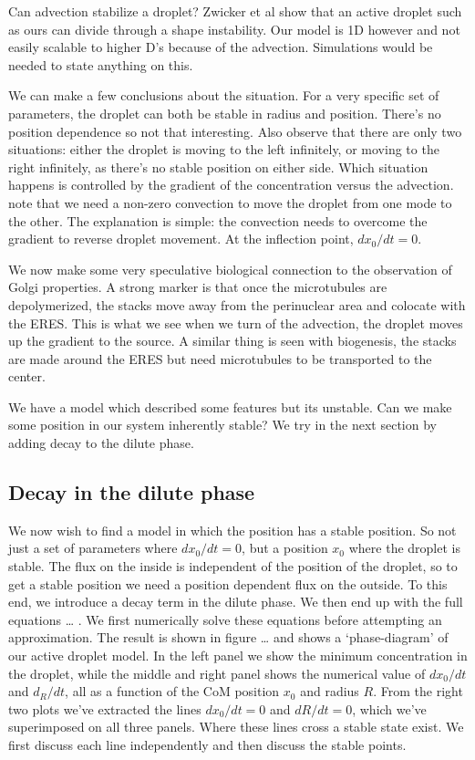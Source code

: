 \documentclass[12pt,a4paper,]{Dissertate}
\begin{document}
Can advection stabilize a droplet? Zwicker et al show that an active
droplet such as ours can divide through a shape instability. Our model
is 1D however and not easily scalable to higher D's because of the
advection. Simulations would be needed to state anything on this.

We can make a few conclusions about the situation. For a very specific
set of parameters, the droplet can both be stable in radius and
position. There's no position dependence so not that interesting. Also
observe that there are only two situations: either the droplet is moving
to the left infinitely, or moving to the right infinitely, as there's no
stable position on either side. Which situation happens is controlled by
the gradient of the concentration versus the advection. note that we
need a non-zero convection to move the droplet from one mode to the
other. The explanation is simple: the convection needs to overcome the
gradient to reverse droplet movement. At the inflection point,
\(dx_0/dt=0\).

We now make some very speculative biological connection to the
observation of Golgi properties. A strong marker is that once the
microtubules are depolymerized, the stacks move away from the
perinuclear area and colocate with the ERES. This is what we see when we
turn of the advection, the droplet moves up the gradient to the source.
A similar thing is seen with biogenesis, the stacks are made around the
ERES but need microtubules to be transported to the center.

We have a model which described some features but its unstable. Can we
make some position in our system inherently stable? We try in the next
section by adding decay to the dilute phase.

\hypertarget{decay-in-the-dilute-phase}{%
\subsection{Decay in the dilute phase}\label{decay-in-the-dilute-phase}}

We now wish to find a model in which the position has a stable position.
So not just a set of parameters where \(dx_0/dt=0\), but a position
\(x_0\) where the droplet is stable. The flux on the inside is
independent of the position of the droplet, so to get a stable position
we need a position dependent flux on the outside. To this end, we
introduce a decay term in the dilute phase. We then end up with the full
equations \ldots{} . We first numerically solve these equations before
attempting an approximation. The result is shown in figure \ldots{} and
shows a `phase-diagram' of our active droplet model. In the left panel
we show the minimum concentration in the droplet, while the middle and
right panel shows the numerical value of \(dx_0/dt\) and \(d_R/dt\), all
as a function of the CoM position \(x_0\) and radius \(R\). From the
right two plots we've extracted the lines \(dx_0/dt=0\) and \(dR/dt=0\),
which we've superimposed on all three panels. Where these lines cross a
stable state exist. We first discuss each line independently and then
discuss the stable points.
\end{document}
